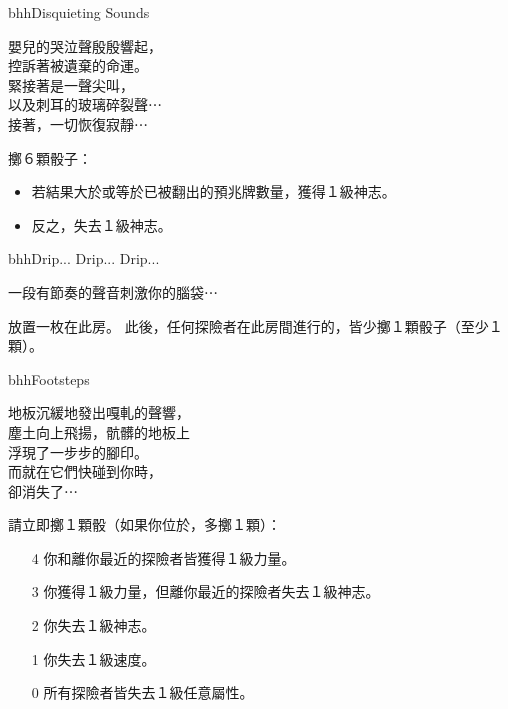 \linebreak[0]%
\begin{EventCard}{bhh}{Disquieting Sounds}
  \begin{CardStory}
    嬰兒的哭泣聲殷殷響起，\\
    控訴著被遺棄的命運。\\
    緊接著是一聲尖叫，\\
    以及刺耳的玻璃碎裂聲⋯\\
    接著，一切恢復寂靜⋯
  \end{CardStory}
  擲６顆骰子：
  \begin{itemize}
    \item 若結果大於或等於已被翻出的預兆牌數量，獲得１級神志。
    \item 反之，失去１級神志。
  \end{itemize}
\end{EventCard}%
\linebreak[0]%
\begin{EventCard}{bhh}{Drip... Drip... Drip...}
  \begin{CardStory}
    一段有節奏的聲音刺激你的腦袋⋯
  \end{CardStory}
  放置一枚在此房。\smallbreak
  此後，任何探險者在此房間進行的，皆少擲１顆骰子（至少１顆）。\smallbreak
\end{EventCard}%
\linebreak[0]%
\begin{EventCard}{bhh}{Footsteps}
  \begin{CardStory}
    地板沉緩地發出嘎軋的聲響，\\
    塵土向上飛揚，骯髒的地板上\\
    浮現了一步步的腳印。\\
    而就在它們快碰到你時，\\
    卻消失了⋯
  \end{CardStory}
  請立即擲１顆骰（如果你位於，多擲１顆）：
  \begin{itemize}
    \item[4] 你和離你最近的探險者皆獲得１級力量。
    \item[3] 你獲得１級力量，但離你最近的探險者失去１級神志。
    \item[2] 你失去１級神志。
    \item[1] 你失去１級速度。
    \item[0] 所有探險者皆失去１級任意屬性。
  \end{itemize}
\end{EventCard}%
\linebreak[0]%
